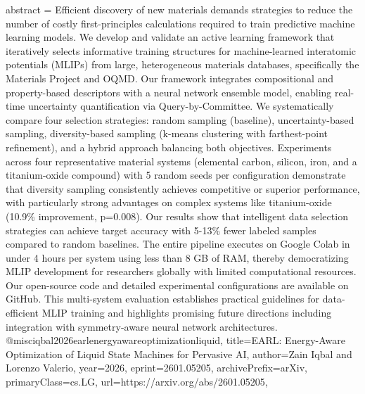 {      abstract = {Efficient discovery of new materials demands strategies to reduce the number of costly first-principles calculations required to train predictive machine learning models. We develop and validate an active learning framework that iteratively selects informative training structures for machine-learned interatomic potentials (MLIPs) from large, heterogeneous materials databases, specifically the Materials Project and OQMD. Our framework integrates compositional and property-based descriptors with a neural network ensemble model, enabling real-time uncertainty quantification via Query-by-Committee. We systematically compare four selection strategies: random sampling (baseline), uncertainty-based sampling, diversity-based sampling (k-means clustering with farthest-point refinement), and a hybrid approach balancing both objectives. Experiments across four representative material systems (elemental carbon, silicon, iron, and a titanium-oxide compound) with 5 random seeds per configuration demonstrate that diversity sampling consistently achieves competitive or superior performance, with particularly strong advantages on complex systems like titanium-oxide (10.9\% improvement, p=0.008). Our results show that intelligent data selection strategies can achieve target accuracy with 5-13\% fewer labeled samples compared to random baselines. The entire pipeline executes on Google Colab in under 4 hours per system using less than 8 GB of RAM, thereby democratizing MLIP development for researchers globally with limited computational resources. Our open-source code and detailed experimental configurations are available on GitHub. This multi-system evaluation establishes practical guidelines for data-efficient MLIP training and highlights promising future directions including integration with symmetry-aware neural network architectures.}
}@misc{iqbal2026earlenergyawareoptimizationliquid,
      title={EARL: Energy-Aware Optimization of Liquid State Machines for Pervasive AI}, 
      author={Zain Iqbal and Lorenzo Valerio},
      year={2026},
      eprint={2601.05205},
      archivePrefix={arXiv},
      primaryClass={cs.LG},
      url={https://arxiv.org/abs/2601.05205},
}
